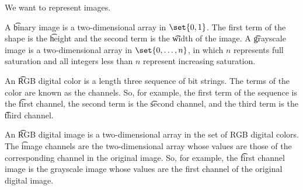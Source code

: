 

We want to represent images.


A \t{binary image} is a two-dimensional array in $\set{0, 1}$.
The first term of the shape is the \t{height} and the second term is the \t{width} of the image.
A \t{grayscale image} is a two-dimensional array in $\set{0, \dots, n}$, in which $n$ represents full saturation and all integers less than $n$ represent increasing saturation.

An \t{RGB digital color} is a length three sequence of bit strings.
The terms of the color are known as the channels.
So, for example, the first term of the sequence is the \t{first channel}, the second term is the \t{second channel}, and the third term is the \t{third channel}.

An \t{RGB digital image} is a two-dimensional array in the set of RGB digital colors.
The \t{image channels} are the two-dimensional array whose values are those of the corresponding channel in the original image.
So, for example, the \t{first channel image} is the grayscale image whose values are the first channel of the original digital image.

\blankpage
